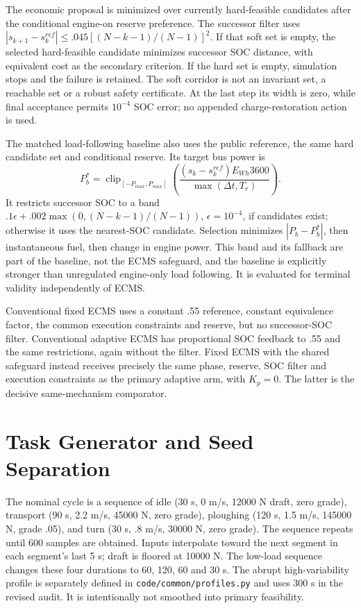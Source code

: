\documentclass[11pt,a4paper]{article}
\begin{document}
The economic proposal is minimized over currently hard-feasible candidates after the conditional engine-on reserve preference. The successor filter uses $|s_{k+1}-s_k^{ref}|\leq.045[(N-k-1)/(N-1)]^2$. If that soft set is empty, the selected hard-feasible candidate minimizes successor SOC distance, with equivalent cost as the secondary criterion. If the hard set is empty, simulation stops and the failure is retained. The soft corridor is not an invariant set, a reachable set or a robust safety certificate. At the last step its width is zero, while final acceptance permits $10^{-4}$ SOC error; no appended charge-restoration action is used.

The matched load-following baseline also uses the public reference, the same hard candidate set and conditional reserve. Its target bus power is
\[
P_b^*=\operatorname{clip}_{[-P_{max},P_{max}]}\!\left(\frac{(s_k-s_k^{ref})E_{Wh}3600}{\max(\Delta t,T_r)}\right).
\]
It restricts successor SOC to a band $.1\epsilon+.002\max(0,(N-k-1)/(N-1))$, $\epsilon=10^{-4}$, if candidates exist; otherwise it uses the nearest-SOC candidate. Selection minimizes $|P_b-P_b^*|$, then instantaneous fuel, then change in engine power. This band and its fallback are part of the baseline, not the ECMS safeguard, and the baseline is explicitly stronger than unregulated engine-only load following. It is evaluated for terminal validity independently of ECMS.

Conventional fixed ECMS uses a constant .55 reference, constant equivalence factor, the common execution constraints and reserve, but no successor-SOC filter. Conventional adaptive ECMS has proportional SOC feedback to .55 and the same restrictions, again without the filter. Fixed ECMS with the shared safeguard instead receives precisely the same phase, reserve, SOC filter and execution constraints as the primary adaptive arm, with $K_p=0$. The latter is the decisive same-mechanism comparator.

\section{Task Generator and Seed Separation}
The nominal cycle is a sequence of idle (30 s, 0 m/s, 12000 N draft, zero grade), transport (90 s, 2.2 m/s, 45000 N, zero grade), ploughing (120 s, 1.5 m/s, 145000 N, grade .05), and turn (30 s, .8 m/s, 30000 N, zero grade). The sequence repeats until 600 samples are obtained. Inputs interpolate toward the next segment in each segment's last 5 s; draft is floored at 10000 N. The low-load sequence changes these four durations to 60, 120, 60 and 30 s. The abrupt high-variability profile is separately defined in \texttt{code/common/profiles.py} and uses 300 s in the revised audit. It is intentionally not smoothed into primary feasibility.
\end{document}
